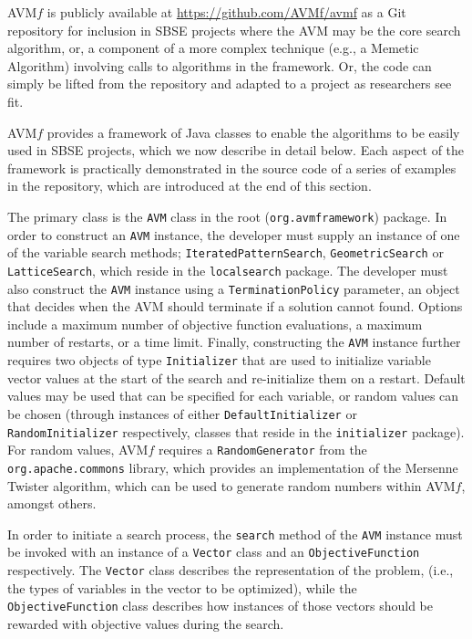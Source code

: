 \documentclass{llncs}
\newcommand{\name}{AVM\hspace{-1pt}$f$\xspace}
\newcommand{\repourl}{\url{https://github.com/AVMf/avmf}\xspace}
\newcommand{\inlineheading}[1]{\vspace{1mm} \noindent {\bf #1.}}
\begin{document}
\name is publicly available at \repourl as a Git repository for inclusion in SBSE projects where the AVM may be the core search algorithm, or, a component of a more complex technique (e.g., a Memetic Algorithm) involving calls to algorithms in the framework. Or, the code can simply be lifted from the repository and adapted to a project as researchers see fit.

\name provides a framework of Java classes to enable the algorithms to be easily used in SBSE projects, which we now describe in detail below. Each aspect of the framework is practically demonstrated in the source code of a series of examples in the repository, which are introduced at the end of this section.

\begin{sloppypar}
\inlineheading{Configuring an AVM search} The primary class is the {\tt AVM} class in the root ({\tt org.avmframework}) package. In order to construct an {\tt AVM} instance, the developer must supply an instance of one of the variable search methods; {\tt IteratedPatternSearch}, {\tt GeometricSearch} or {\tt LatticeSearch}, which reside in the {\tt localsearch} package. The developer must also construct the {\tt AVM} instance using a {\tt TerminationPolicy} parameter, an object that decides when the AVM should terminate if a solution cannot found. Options include a maximum number of objective function evaluations, a maximum number of restarts, or a time limit. Finally, constructing the {\tt AVM} instance further requires two objects of type {\tt Initializer} that are used to initialize variable vector values at the start of the search and re-initialize them on a restart. Default values may be used that can be specified for each variable, or random values can be chosen (through instances of either {\tt DefaultInitializer} or {\tt RandomInitializer} respectively, classes that reside in the {\tt initializer} package). For random values, \name requires a {\tt RandomGenerator} from the {\tt org.apache.commons} library, which provides an implementation of the Mersenne Twister algorithm, which can be used to generate random numbers within \name, amongst others.
\end{sloppypar}

\begin{sloppypar}
In order to initiate a search process, the {\tt search} method of the {\tt AVM} instance must be invoked with an instance of a {\tt Vector} class and an {\tt ObjectiveFunction} respectively. The {\tt Vector} class describes the representation of the problem,
(i.e., the types of variables in the vector to be optimized), while the {\tt ObjectiveFunction} class describes how instances of those vectors should be rewarded with objective values during the search.
\end{sloppypar}
\end{document}
